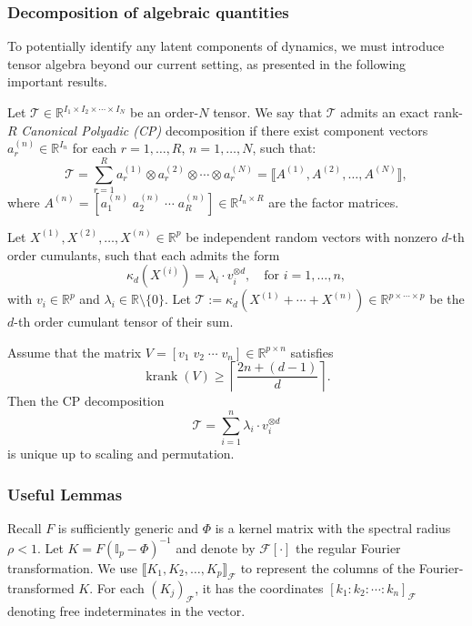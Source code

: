 \documentclass[10pt]{article}
\numberwithin{figure}{section}
\begin{document}
\subsubsection{Decomposition of algebraic quantities}

To potentially identify any latent components of dynamics, we must introduce tensor algebra beyond our current setting, as presented in the following important results.

\begin{acorollary}[CP decomposition]\label{col:cumulant_cp}
Let \( \mathcal{T} \in \mathbb{R}^{I_1 \times I_2 \times \cdots \times I_N} \) be an order-\( N \) tensor. We say that \( \mathcal{T} \) admits an exact rank-\( R \) \emph{Canonical Polyadic (CP)} decomposition if there exist component vectors \( a_r^{(n)} \in \mathbb{R}^{I_n} \) for each \( r = 1,\dots,R \), \( n = 1,\dots,N \), such that:
\[
\mathcal{T} = \sum_{r=1}^{R} a_r^{(1)} \otimes a_r^{(2)} \otimes \cdots \otimes a_r^{(N)} = \llbracket A^{(1)}, A^{(2)}, \dots, A^{(N)} \rrbracket,
\]
where \( A^{(n)} = [a_1^{(n)} \; a_2^{(n)} \; \cdots \; a_R^{(n)}] \in \mathbb{R}^{I_n \times R} \) are the factor matrices.
\end{acorollary}
\begin{acorollary}\label{col:cumulant_cp_unique}
Let \( X^{(1)}, X^{(2)}, \dots, X^{(n)} \in \mathbb{R}^p \) be independent random vectors with nonzero $d$-th order cumulants, such that each admits the form
\[
\kappa_d(X^{(i)}) = \lambda_i \cdot v_i^{\otimes d}, \quad \text{for } i = 1, \dots, n,
\]
with \( v_i \in \mathbb{R}^p \) and \( \lambda_i \in \mathbb{R} \setminus \{0\} \). Let \( \mathcal{T} := \kappa_d(X^{(1)} + \cdots + X^{(n)}) \in \mathbb{R}^{p \times \cdots \times p} \) be the $d$-th order cumulant tensor of their sum.

Assume that the matrix \( V = [v_1 \; v_2 \; \cdots \; v_n] \in \mathbb{R}^{p \times n} \) satisfies
\[
\operatorname{krank}(V) \geq \left\lceil \frac{2n + (d - 1)}{d} \right\rceil.
\]
Then the CP decomposition
\[
\mathcal{T} = \sum_{i=1}^n \lambda_i \cdot v_i^{\otimes d}
\]
is unique up to scaling and permutation.
\end{acorollary}
\subsubsection{Useful Lemmas}\label{lemmaAlg}

Recall $F$ is sufficiently generic and $\Phi$ is a kernel matrix with the spectral radius $\rho < 1$. Let $K = F(\mathbb{I}_{p} - \Phi)^{-1}$ and denote by $\mathcal{F}[\cdot]$ the regular Fourier transformation. We use $\llbracket K_1, K_2, \dots, K_p \rrbracket_{\mathcal{F}}$ to represent the columns of the Fourier-transformed $K$. For each $(K_j)_{\mathcal{F}}$, it has the coordinates $[k_{1} : k_{2} : \cdots : k_{n}]_{\mathcal{F}}$ denoting free indeterminates in the vector. 
\end{document}
